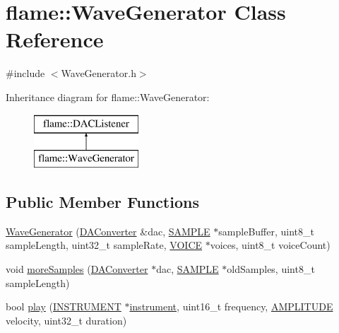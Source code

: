 \hypertarget{classflame_1_1_wave_generator}{\section{flame\-:\-:Wave\-Generator Class Reference}
\label{classflame_1_1_wave_generator}
}


{\ttfamily \#include $<$Wave\-Generator.\-h$>$}

Inheritance diagram for flame\-:\-:Wave\-Generator\-:\begin{figure}[H]
\begin{center}
\leavevmode
\includegraphics[height=2.000000cm]{classflame_1_1_wave_generator}
\end{center}
\end{figure}
\subsection*{Public Member Functions}
\begin{DoxyCompactItemize}
\item 
\hyperlink{classflame_1_1_wave_generator_a33e33b8cbf6ffd8ba02760574188a970}{Wave\-Generator} (\hyperlink{classflame_1_1_d_a_converter}{D\-A\-Converter} \&dac, \hyperlink{_d_a_c_8h_a5a6d1dc37ffa32957a63868cd1da39b3}{S\-A\-M\-P\-L\-E} $\ast$sample\-Buffer, uint8\-\_\-t sample\-Length, uint32\-\_\-t sample\-Rate, \hyperlink{namespaceflame_a69cbce86034387173caf0aaf772a5d3b}{V\-O\-I\-C\-E} $\ast$voices, uint8\-\_\-t voice\-Count)
\item 
void \hyperlink{classflame_1_1_wave_generator_ac94e2fa02447ef96aba48b88181eddeb}{more\-Samples} (\hyperlink{classflame_1_1_d_a_converter}{D\-A\-Converter} $\ast$dac, \hyperlink{_d_a_c_8h_a5a6d1dc37ffa32957a63868cd1da39b3}{S\-A\-M\-P\-L\-E} $\ast$old\-Samples, uint8\-\_\-t sample\-Length)
\item 
bool \hyperlink{classflame_1_1_wave_generator_a0a1404ff26873712073b396c0a94aac4}{play} (\hyperlink{namespaceflame_a7f0c5adbd1329cd2947d15e6af02dbf1}{I\-N\-S\-T\-R\-U\-M\-E\-N\-T} $\ast$\hyperlink{structflame_1_1instrument}{instrument}, uint16\-\_\-t frequency, \hyperlink{namespaceflame_a7f6447252c60127b805475b293831f99}{A\-M\-P\-L\-I\-T\-U\-D\-E} velocity, uint32\-\_\-t duration)
\end{DoxyCompactItemize}


